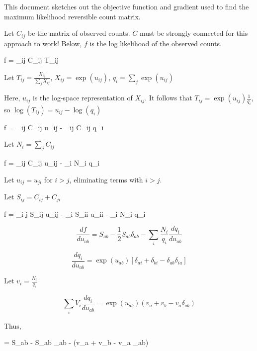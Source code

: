 \documentclass[12pt]{article}
\let\[\equation
\let\]\endequation
\begin{document}
This document sketches out the objective function and gradient used to find the maximum likelihood reversible count matrix.  

Let $C_{ij}$ be the matrix of observed counts.  $C$ must be strongly connected for this approach to work!  Below, $f$ is the log likelihood of the observed counts.

\[
f = \sum_{ij} C_{ij} \log T_{ij}
\]



Let $T_{ij} = \frac{X_{ij}}{\sum_j X_{ij}}$, $X_{ij} =  \exp(u_{ij})$, $q_i = \sum_j \exp(u_{ij})$

Here, $u_{ij}$ is the log-space representation of $X_{ij}$.  It follows that $T_{ij} = \exp(u_{ij}) \frac{1}{q_i}$, so $\log(T_{ij}) = u_{ij} - \log(q_{i})$

\[f = \sum_{ij} C_{ij} u_{ij} - \sum_{ij} C_{ij} \log q_i\]

Let $N_i = \sum_j C_{ij}$

\[f = \sum_{ij} C_{ij} u_{ij} - \sum_{i} N_i \log q_i\]

Let $u_{ij} = u_{ji}$ for $i > j$, eliminating terms with $i>j$.

Let $S_{ij} = C_{ij} + C_{ji}$

\[f = \sum_{i \le j} S_{ij} u_{ij} -  \sum_i S_{ii} u_{ii} - \sum_i N_i \log q_i\]


$$\frac{df}{du_{ab}} = S_{ab}  - \frac{1}{2} S_{ab} \delta_{ab} - \sum_i \frac{N_i}{q_i} \frac{dq_i}{du_{ab}}$$

$$\frac{dq_i}{du_{ab}} = \exp(u_{ab}) [\delta_{ai} + \delta_{bi} - \delta_{ab} \delta_{ia}]$$

Let $v_i = \frac{N_i}{q_i}$

$$ \sum_i V_i \frac{dq_i}{du_{ab}} = \exp(u_{ab}) (v_a + v_b - v_a \delta_{ab})$$ 

Thus,

\[ = S_{ab}  -  S_{ab} \delta_{ab} - (v_a + v_b - v_a \delta_{ab})\]
\end{document}
